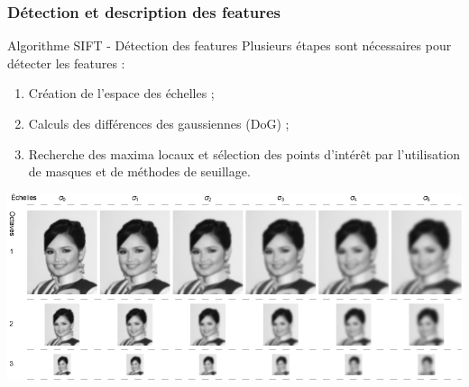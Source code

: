 \documentclass[8pt]{beamer}
\begin{document}
	\begin{frame}
		\frametitle{Détection et description des features}
		\begin{block}{Algorithme SIFT - Détection des features}
			Plusieurs étapes sont nécessaires pour détecter les features :
			\begin{enumerate}
				\item<1-> Création de l'espace des échelles ;
				\item<2-> Calculs des différences des gaussiennes (DoG) ;
				\item<3-> Recherche des maxima locaux et sélection des points d'intérêt par l'utilisation de masques et de méthodes de seuillage.
			\end{enumerate}
		\end{block}
		\hfill
		\begin{minipage}[c]{.3\textwidth}
			\includegraphics[width=\textwidth]{SIFT-scale.png}
		\end{minipage}\hfill
		\begin{minipage}[c]{.3\textwidth}

\end{minipage}
\end{frame}
\end{document}
